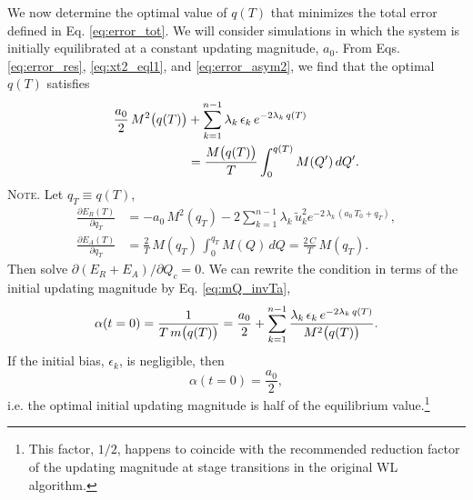 \documentclass[reprint, superscriptaddress, floatfix]{revtex4-1}
\newcommand{\note}[1]{{\color{DarkGreen}\footnotesize \textsc{Note.} #1}}
\newcommand{\Err}{E}
\begin{document}
We now determine the optimal value of $q(T)$
that minimizes the total error defined in Eq. \eqref{eq:error_tot}.
%
We will consider simulations in which
the system is initially equilibrated at a
constant updating magnitude, $a_0$.
%
From Eqs. \eqref{eq:error_res}, \eqref{eq:xt2_eql1},
and \eqref{eq:error_asym2},
we find that
the optimal $q(T)$ satisfies
%
\begin{align}
  \frac{a_0}{2} \, M^2\bigl( q(T) \bigr)
  &+
  \sum_{k = 1}^{n-1}
  \lambda_k \, \epsilon_k \, e^{-2\lambda_k \, q(T)}
  \notag \\
  &= \frac{ M\bigl( q(T) \bigr) } { T } \int_0^{q(T)} M(Q') \, dQ'
  .
\label{eq:opt_qT}
\end{align}
%
%
\note{Let $q_T \equiv q(T)$,
$$
\begin{aligned}
  \frac{
    \partial \Err_R(T)
  }
  {
    \partial q_T
  }
  &=
  -a_0 \, M^2(q_T)
  -2
  \sum_{k=1}^{n-1} \lambda_k \,
  \tilde u_k^2 e^{-2 \, \lambda_k \, (a_0 \, T_0 + q_T)}
  ,
  \\
  \frac{
    \partial \Err_A(T)
  }
  {
    \partial q_T
  }
  &=
  \frac 2 T \,
  M(q_T) \,
  \int_0^{ q_T } M(Q) \, dQ
  =
  \frac{ 2 \, C } { T } \, M(q_T)
  .
\end{aligned}
$$
Then solve $\partial (\Err_R + \Err_A) / \partial Q_c = 0$.
}
%
We can rewrite the condition in terms of
the initial updating magnitude by Eq. \eqref{eq:mQ_invTa},
\begin{align}
  \alpha(t = 0)
  =
  \frac{1}{T \, m\bigl( q(T) \bigr) }
  =
  \frac{ a_0 } { 2 }
  +
  \sum_{k = 1}^{n-1}
  \frac{
    \lambda_k \, \epsilon_k \, e^{-2\lambda_k \, q(T)}
  }{M^2\bigl( q(T) \bigr)}
  .
  \notag %
\end{align}
%
If the initial bias, $\epsilon_k$, is negligible, then
%
\begin{equation}
  \alpha( t = 0 )
  =
  \frac{ a_0 }
       { 2 }
  ,
\label{eq:half_alpha0}
\end{equation}
%
i.e. the optimal initial updating magnitude
is half of the equilibrium value.\footnote{This factor, $1/2$,
happens to coincide with the
recommended reduction factor of the updating magnitude
at stage transitions
in the original WL algorithm\cite{
wang2001, *wang2001pre}.
}
\end{document}
